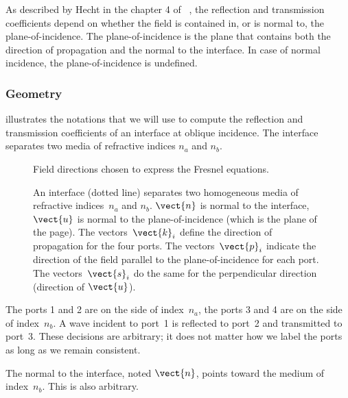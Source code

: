 As described by Hecht in the chapter 4 of ~\cite{hecht2002optics}, the reflection and transmission coefficients depend on whether the field is contained in, or is normal to, the plane-of-incidence.
The plane-of-incidence is the plane that contains both the direction of propagation and the normal to the interface.
In case of normal incidence, the plane-of-incidence is undefined.


\subsubsection{Geometry}
 illustrates the notations that we will use to compute the reflection and transmission coefficients of an interface at oblique incidence.
The interface separates two media of refractive indices $n_a$ and $n_b$.

\begin{figure}[hbtp]
    \centering
    
    \caption{Field directions chosen to express the Fresnel equations.}
    \caption*{
        An interface (dotted line) separates two homogeneous media of refractive indices~$n_a$ and $n_b$.
        $\vect{n}$ is normal to the interface,
        $\vect{u}$ is normal to the plane-of-incidence (which is the plane of the page).
        The vectors~$\vect{k}_i$ define the direction of propagation for the four ports.
        The vectors~$\vect{p}_i$ indicate the direction of the field parallel to the plane-of-incidence for each port.
        The vectors~$\vect{s}_i$ do the same for the perpendicular direction (direction of $\vect{u}$).
    }
    \label{fig:fresnel_directions}
\end{figure}

The ports 1 and 2 are on the side of index~$n_a$, the ports 3 and 4 are on the side of index~$n_b$.
A wave incident to port~1 is reflected to port~2 and transmitted to port~3.
These decisions are arbitrary;
it does not matter how we label the ports as long as we remain consistent.

The normal to the interface, noted $\vect{n}$, points toward the medium of index~$n_b$.
This is also arbitrary.

